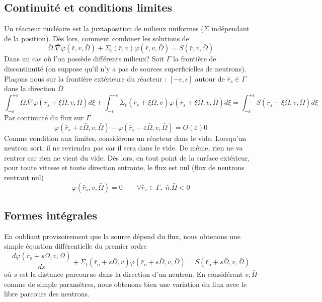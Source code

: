 \subsection{Continuité et conditions limites}
Un réacteur nucléaire est la juxtaposition de milieux uniformes ($\Sigma$ indépendant de la 
position). Dès lors, comment combiner les solutions de
\begin{equation}
\bar \Omega .\bar \nabla \varphi (\bar r,v,\bar \Omega ) + {\Sigma _t}(\bar r,v)\varphi (\bar r,v,\bar \Omega ) = S(\bar r,v,\bar \Omega )
\end{equation}
Dans un cas où l'on possède différents milieux? Soit $\Gamma$ la frontière de discontinuité (on 
suppose qu'il n'y a pas de sources superficielles de neutrons). Plaçons nous sur la frontière 
extérieure du réacteur : $[-\epsilon,\epsilon]$ autour de $\bar r_s\in\Gamma$ dans la direction 
$\bar\Omega$
\begin{equation}
\int_{ - \varepsilon }^{ + \varepsilon }    \bar \Omega .\bar \nabla \varphi ({\bar r_s} + \xi \bar \Omega ,v,\bar \Omega )d\xi  + \int_{ - \varepsilon }^{ + \varepsilon }    {\Sigma _t}({\bar r_s} + \xi \bar \Omega ,v)\varphi ({\bar r_s} + \xi \bar \Omega ,v,\bar \Omega )d\xi  = \int_{ - \varepsilon }^{ + \varepsilon }    S({\bar r_s} + \xi \bar \Omega ,v,\bar \Omega )d\xi 
\end{equation}
Par continuité du flux sur $\Gamma$
\begin{equation}
\varphi ({\bar r_s} + \varepsilon \bar \Omega ,v,\bar \Omega ) - \varphi ({\bar r_s} - \varepsilon \bar \Omega ,v,\bar \Omega ) = O(\varepsilon )0
\end{equation}
Comme condition aux limites, considérons un réacteur dans le vide. Lorsqu'un neutron sort, il ne 
reviendra pas car il sera dans le vide. De même, rien ne va rentrer car rien ne vient du vide. Dès 
lors, en tout point de la surface extérieur, pour toute vitesse et toute direction entrante, le 
flux est nul (flux de neutrons rentrant nul)
\begin{equation}
\varphi ({\bar r_s},v,\bar \Omega ) = 0\quad \quad \forall {\bar r_s} \in \Gamma ,\;\bar n.\bar \Omega  < 0
\end{equation}

\subsection{Formes intégrales}
En oubliant provisoirement que la source dépend du flux, nous obtenons une simple équation 
différentielle du premier ordre
\begin{equation}
\frac{{d\varphi ({{\bar r}_o} + s\bar \Omega ,v,\bar \Omega )}}{{ds}} + {\Sigma _t}({\bar r_o} + s\bar \Omega ,v)\varphi ({\bar r_o} + s\bar \Omega ,v,\bar \Omega ) = S({\bar r_o} + s\bar \Omega ,v,\bar \Omega )
\end{equation}
où $s$ est la distance parcourue dans la direction d'un neutron. En considérant $v, \bar\Omega$ comme 
de simple paramètres, nous obtenons bien une variation du flux avec le libre parcours des neutrons.\\

